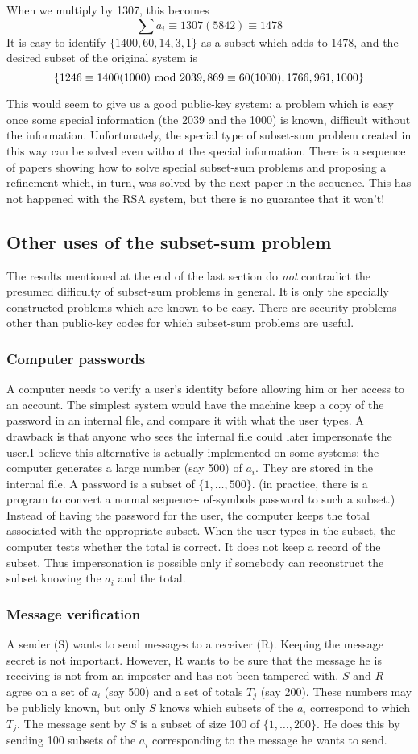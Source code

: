 When we multiply by 1307, this becomes$$\sum a_i\equiv1307(5842)\equiv
1478$$It is easy to identify $\{1400,60,14,3,1\}$ as a subset
which adds to 1478, and the desired subset of the original
system is $$\{1246\equiv1400(1000)\hbox{ mod }2039,869\equiv60(1000),1766,
961,1000\}$$\par This would seem to give us a good public-key
system: a problem which is easy once some special information
(the 2039 and the 1000) is known, difficult without the information.
Unfortunately, the special type of subset-sum problem created in
this way can be solved even without the special information.
There is a sequence of papers showing how to solve special subset-sum
problems and proposing a refinement which, in turn, was solved by
the next paper in the sequence. This has not happened with the 
RSA system, but there is no guarantee that it won't!
\subsection{Other uses of the subset-sum problem}
The results mentioned at the end of the last section do {\it not\/}
contradict the presumed difficulty of subset-sum problems in
general.  It is only the specially constructed problems which
are known to be easy.  There are security problems other than
public-key codes for which subset-sum problems are useful.
\subsubsection{Computer passwords} A computer needs to verify a
user's identity before allowing him or her access to an account.
The simplest system would have the machine keep a copy of the
password in an internal file, and compare it with what the user
types.  A drawback is that anyone who sees the internal file
could later impersonate the user.\pq I believe this alternative
is actually implemented on some systems: the computer generates
a large number (say 500) of $a_i$.  They are stored in the 
internal file. A password is a subset of $\{1,\dots,500\}$.
(in practice, there is a program to convert a normal sequence-%
of-symbols password to such a subset.) Instead of having the
password for the user, the computer keeps the total associated
with the appropriate subset.  When the user types in the subset,
the computer tests whether the total is correct.  It does not
keep a record of the subset.  Thus impersonation is possible
only if somebody can reconstruct the subset knowing the $a_i$
and the total.
\subsubsection{Message verification} A sender (S) wants to send
messages to a receiver (R).  Keeping the message secret
is not important.  However, R wants to be sure that the message
he is receiving is not from an imposter and has not been tampered
with.  $S$ and $R$ agree on a set of $a_i$ (say 500) and a 
set of totals $T_j$ (say 200).  These numbers may be publicly
known, but only $S$ knows which subsets of the $a_i$ correspond
to which $T_j$.  The message sent by $S$ is a subset of size 100
of $\{1,\dots,200\}$.  He does this by sending 100 subsets of the
$a_i$ corresponding to the message he wants to send.
